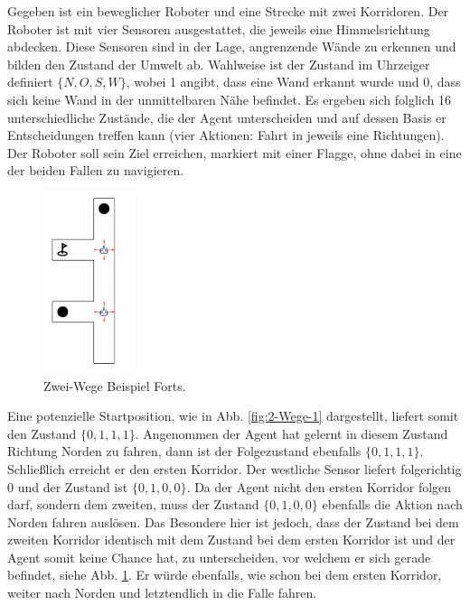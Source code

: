 Gegeben ist ein beweglicher Roboter und eine Strecke mit zwei Korridoren. Der Roboter ist mit vier Sensoren ausgestattet, die jeweils eine Himmelsrichtung abdecken. Diese Sensoren sind in der Lage, angrenzende Wände zu erkennen und bilden den Zustand der Umwelt ab. Wahlweise ist der Zustand im Uhrzeiger definiert $\{N, O, S, W\}$, wobei 1 angibt, dass eine Wand erkannt wurde und 0, dass sich keine Wand in der unmittelbaren Nähe befindet. Es ergeben sich folglich 16 unterschiedliche Zustände, die der Agent unterscheiden und auf dessen Basis er Entscheidungen treffen kann (vier Aktionen: Fahrt in jeweils eine Richtungen). Der Roboter soll sein Ziel erreichen, markiert mit einer Flagge, ohne dabei in eine der beiden Fallen zu navigieren.
\par
\begin{figure}
  \begin{center}
  \includegraphics[height=200px]{images/2passagesStart.png}  \end{center}
  \caption{Zwei-Wege Beispiel Forts.}
  \label{fig:2-Wege-2}
\end{figure}

Eine potenzielle Startposition, wie in Abb. \ref{fig:2-Wege-1} dargestellt, liefert somit den Zustand $\{0, 1, 1, 1\}$. Angenommen der Agent hat gelernt in diesem Zustand Richtung Norden zu fahren, dann ist der Folgezustand ebenfalls $\{0, 1, 1, 1\}$. Schließlich erreicht er den ersten Korridor. Der westliche Sensor liefert folgerichtig 0 und der Zustand ist $\{0, 1, 0, 0\}$. Da der Agent nicht den ersten Korridor folgen darf, sondern dem zweiten, muss der Zustand $\{0, 1, 0, 0\}$ ebenfalls die Aktion \glqq nach Norden fahren\grqq{} auslösen. Das Besondere hier ist jedoch, dass der Zustand bei dem zweiten Korridor identisch mit dem Zustand bei dem ersten Korridor ist und der Agent somit keine Chance hat, zu unterscheiden, vor welchem er sich gerade befindet, siehe Abb. \ref{fig:2-Wege-2}. Er würde ebenfalls, wie schon bei dem ersten Korridor, weiter nach Norden und letztendlich in die Falle fahren.
\par 

